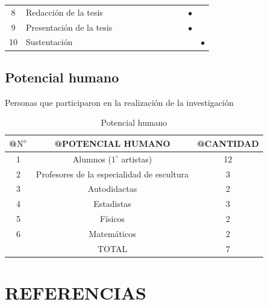 \documentclass[12pt,a4paper]{article}
\begin{document}
\begin{table}[ht!]
\begin{tabular}{|c|p{6cm}|c|c|c|c|c|c|c|c|c|c|}
		8                   & Redacción de la tesis             &                           &           &           &           &           &           &           &           & $\bullet$ &           \\
		9                   & Presentación de la tesis          &                           &           &           &           &           &           &           &           & $\bullet$ &           \\
		10                  & Sustentación                      &                           &           &           &           &           &           &           &           &           & $\bullet$ \\
		\hline
	\end{tabular}
\end{table}



\subsection{Potencial humano}
Personas que participaron en la realización de la investigación

\begin{table}[ht]
	\centering
	\caption{Potencial humano}\label{potencialhumano}
	\begin{tabular}{ccc}
		\Xhline{2pt}
		@$\text N^\circ$ & @POTENCIAL HUMANO                          & @CANTIDAD \\\midrule
		1                & Alumnos ($1^\circ$ artistas)               & 12        \\
		2                & Profesores de la especialidad de escultura & 3         \\
		3                & Autodidactas                               & 2         \\
		4                & Estadistas                                 & 3         \\
		5                & Físicos                                    & 2         \\
		6                & Matemáticos                                & 2         \\\midrule
		                 & TOTAL                                      & 7         \\
		\bottomrule
	\end{tabular}
\end{table}



\section{REFERENCIAS}


\end{document}
